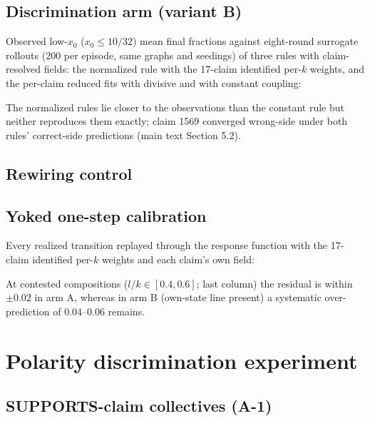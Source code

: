 \documentclass[11pt]{article}
\begin{document}
\subsection{Discrimination arm (variant B)}
\begin{center}

\end{center}

Observed low-$x_0$ ($x_0 \le 10/32$) mean final fractions against eight-round
surrogate rollouts (200 per episode, same graphs and seedings) of three rules
with claim-resolved fields: the normalized rule with the 17-claim identified
per-$k$ weights, and the per-claim reduced fits with divisive and with
constant coupling:
\begin{center}
\small
\resizebox{\textwidth}{!}{}
\end{center}
The normalized rules lie closer to the observations than the constant rule
but neither reproduces them exactly; claim 1569 converged wrong-side under
both rules' correct-side predictions (main text Section 5.2).

\subsection{Rewiring control}
\begin{center}

\end{center}

\subsection{Yoked one-step calibration}
Every realized transition replayed through the response function with the
17-claim identified per-$k$ weights and each claim's own field:
\begin{center}
\small

\end{center}
At contested compositions ($l/k \in [0.4, 0.6]$; last column) the residual
is within $\pm 0.02$ in arm A, whereas in arm B (own-state line present) a
systematic over-prediction of $0.04$--$0.06$ remains.

\section{Polarity discrimination experiment}

\subsection{SUPPORTS-claim collectives (A-1)}
\begin{center}

\end{center}
\end{document}
